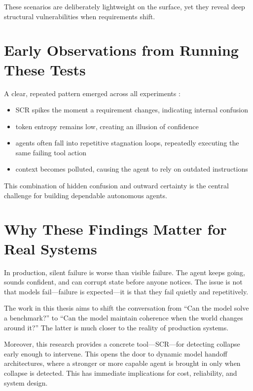 \documentclass[12pt,a4paper]{report}
\begin{document}
These scenarios are deliberately lightweight on the surface, yet they reveal deep structural vulnerabilities when requirements shift.

\section{Early Observations from Running These Tests}
A clear, repeated pattern emerged across all experiments \cite{Chen2024ToolsFail, Chen2023ToolEmu}:
\begin{itemize}
    \item SCR spikes the moment a requirement changes, indicating internal confusion
    \item token entropy remains low, creating an illusion of confidence
    \item agents often fall into repetitive stagnation loops, repeatedly executing the same failing tool action
    \item context becomes polluted, causing the agent to rely on outdated instructions
\end{itemize}

This combination of hidden confusion and outward certainty is the central challenge for building dependable autonomous agents.

\section{Why These Findings Matter for Real Systems}
In production, silent failure is worse than visible failure. The agent keeps going, sounds confident, and can corrupt state before anyone notices. The issue is not that models fail—failure is expected—it is that they fail quietly and repetitively.

The work in this thesis aims to shift the conversation from “Can the model solve a benchmark?” to “Can the model maintain coherence when the world changes around it?” The latter is much closer to the reality of production systems.

Moreover, this research provides a concrete tool—SCR—for detecting collapse early enough to intervene. This opens the door to dynamic model handoff architectures, where a stronger or more capable agent is brought in only when collapse is detected. This has immediate implications for cost, reliability, and system design.
\end{document}

